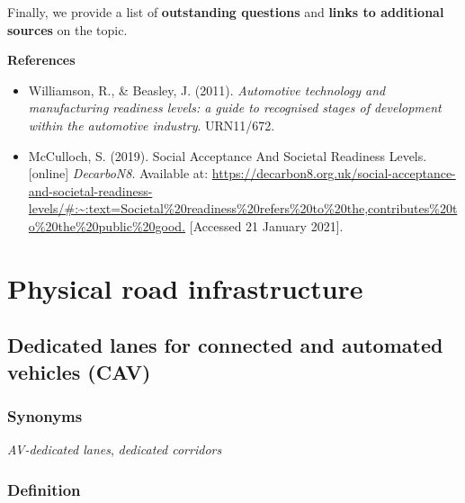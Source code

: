 \documentclass[
]{book}
\providecommand{\tightlist}{%
  \setlength{\itemsep}{0pt}\setlength{\parskip}{0pt}}
\begin{document}
Finally, we provide a list of \textbf{outstanding questions} and \textbf{links to additional sources} on the topic.

\textbf{References}

\begin{itemize}
\tightlist
\item
  Williamson, R., \& Beasley, J. (2011). \emph{Automotive technology and manufacturing readiness levels: a guide to recognised stages of development within the automotive industry}. URN11/672.
\item
  McCulloch, S. (2019). Social Acceptance And Societal Readiness Levels. {[}online{]} \emph{DecarboN8}. Available at: \url{https://decarbon8.org.uk/social-acceptance-and-societal-readiness-levels/\#:~:text=Societal\%20readiness\%20refers\%20to\%20the,contributes\%20to\%20the\%20public\%20good.} {[}Accessed 21 January 2021{]}.
\end{itemize}

\hypertarget{infrastructure}{%
\chapter{Physical road infrastructure}\label{infrastructure}}

\hypertarget{dedicated-lanes-for-connected-and-automated-vehicles-cav}{%
\section{Dedicated lanes for connected and automated vehicles (CAV)}\label{dedicated-lanes-for-connected-and-automated-vehicles-cav}}

\hypertarget{synonyms}{%
\subsection*{Synonyms}\label{synonyms}}

\emph{AV-dedicated lanes}, \emph{dedicated corridors}

\hypertarget{definition}{%
\subsection*{Definition}\label{definition}}
\end{document}
